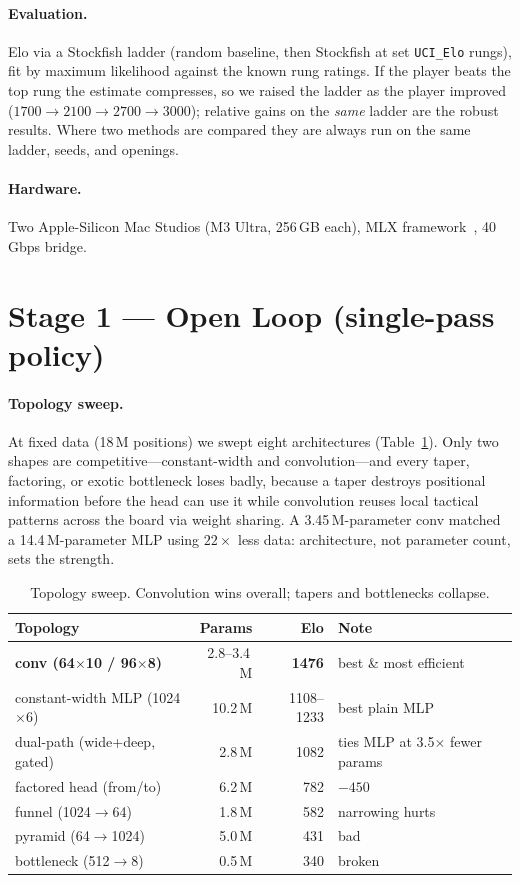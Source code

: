 \documentclass[11pt]{article}
\begin{document}
\paragraph{Evaluation.} Elo via a Stockfish ladder (random baseline, then Stockfish at set
\texttt{UCI\_Elo} rungs), fit by maximum likelihood against the known rung ratings. If the player
beats the top rung the estimate compresses, so we raised the ladder as the player improved
($1700\rightarrow2100\rightarrow2700\rightarrow3000$); relative gains on the \emph{same} ladder are
the robust results. Where two methods are compared they are always run on the same ladder, seeds,
and openings.

\paragraph{Hardware.} Two Apple-Silicon Mac Studios (M3 Ultra, 256\,GB each), MLX
framework~\cite{mlx2023}, 40\,Gbps bridge.

\section{Stage 1 --- Open Loop (single-pass policy)}
\paragraph{Topology sweep.} At fixed data (18\,M positions) we swept eight architectures
(Table~\ref{tab:topo}). Only two shapes are competitive---constant-width and convolution---and every
taper, factoring, or exotic bottleneck loses badly, because a taper destroys positional information
before the head can use it while convolution reuses local tactical patterns across the board via
weight sharing. A 3.45\,M-parameter conv matched a 14.4\,M-parameter MLP using $22\times$ less data:
architecture, not parameter count, sets the strength.

\begin{table}[t]\centering\small
\begin{tabular}{lrrl}
\toprule
Topology & Params & Elo & Note \\
\midrule
\textbf{conv (64$\times$10 / 96$\times$8)} & 2.8--3.4\,M & \textbf{1476} & best \& most efficient \\
constant-width MLP (1024$\times$6) & 10.2\,M & 1108--1233 & best plain MLP \\
dual-path (wide+deep, gated) & 2.8\,M & 1082 & ties MLP at 3.5$\times$ fewer params \\
factored head (from/to) & 6.2\,M & 782 & $-450$ \\
funnel (1024$\rightarrow$64) & 1.8\,M & 582 & narrowing hurts \\
pyramid (64$\rightarrow$1024) & 5.0\,M & 431 & bad \\
bottleneck (512$\rightarrow$8) & 0.5\,M & 340 & broken \\
\bottomrule
\end{tabular}
\caption{Topology sweep. Convolution wins overall; tapers and bottlenecks collapse.}
\label{tab:topo}
\end{table}
\end{document}
